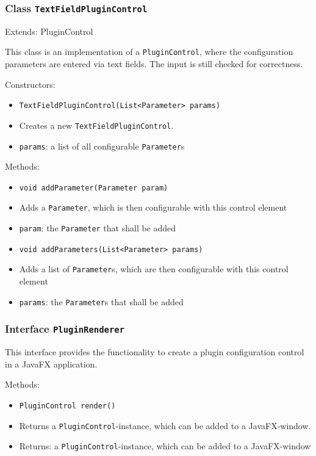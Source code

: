 \documentclass[parskip=full,11pt]{scrartcl}
\begin{document}
\subsubsection{Class \texttt{TextFieldPluginControl}}
Extends: PluginControl
 
This class is an implementation of a \texttt{PluginControl}, where the configuration parameters are entered via text fields. The input is still checked for correctness.

Constructors:

\begin{itemize}\itemsep -10pt
	\item \texttt{TextFieldPluginControl(List<Parameter> params)}
	\item[] Creates a new \texttt{TextFieldPluginControl}.
	\item[] \texttt{params}: a list of all configurable \texttt{Parameter}s
\end{itemize}

Methods:

\begin{itemize}\itemsep -10pt
	\item \texttt{void addParameter(Parameter param)}
	\item[] Adds a \texttt{Parameter}, which is then configurable with this control element
	\item[] \texttt{param}: the \texttt{Parameter} that shall be added
	\item \texttt{void addParameters(List<Parameter> params)}
	\item[] Adds a list of \texttt{Parameter}s, which are then configurable with this control element
	\item[] \texttt{params}: the \texttt{Parameter}s that shall be added
\end{itemize}

\subsubsection{Interface \texttt{PluginRenderer}}

This interface provides the functionality to create a plugin configuration control in a JavaFX application.

Methods:

\begin{itemize}\itemsep -10pt
	\item \texttt{PluginControl render()}
	\item[] Returns a \texttt{PluginControl}-instance, which can be added to a JavaFX-window.
	\item[] Returns: a \texttt{PluginControl}-instance, which can be added to a JavaFX-window
\end{itemize}
\end{document}
